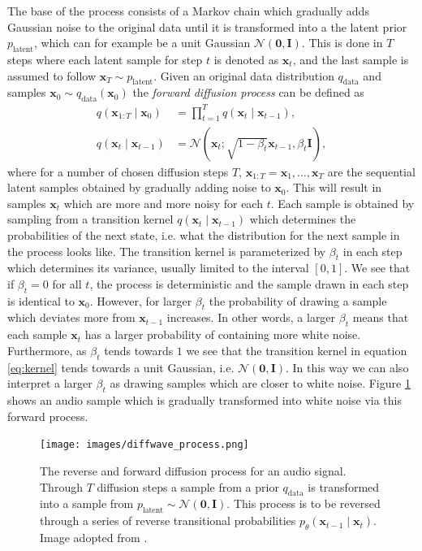\documentclass{report}
\begin{document}
The base of the process consists of a Markov chain which gradually adds Gaussian noise to the original data until it is transformed into a the latent prior $p_{\text{latent}}$, which can for example be a unit Gaussian $\mathcal{N}(\bm{0}, \bm{I})$. This is done in $T$ steps where each latent sample for step $t$ is denoted as $\bm{x}_t$, and the last sample is assumed to follow $\bm{x}_T \sim p_{\text{latent}}$. Given an original data distribution $q_{\text{data}}$ and samples $\bm{x}_0 \sim q_{\text{data}}(\bm{x}_0)$ the \textit{forward diffusion process} can be defined as
\begin{align}
    q(\bm{x}_{1:T} \mid \bm{x}_0) &= \prod_{t=1}^T q(\bm{x}_t \mid \bm{x}_{t-1}), \\
    q(\bm{x}_t \mid \bm{x}_{t-1}) &= \mathcal{N}(\bm{x}_t ; \sqrt{1-\beta_t} \bm{x}_{t-1}, \beta_t \textbf{I}), \label{eq:kernel}
\end{align}
where for a number of chosen diffusion steps $T$, $\bm{x}_{1:T} = \bm{x}_1, \dots, \bm{x}_T$ are the sequential latent samples obtained by gradually adding noise to $\bm{x}_0$. This will result in samples $\bm{x}_t$ which are more and more noisy for each $t$. Each sample is obtained by sampling from a transition kernel $q(\bm{x}_t \mid \bm{x}_{t-1})$ which determines the probabilities of the next state, i.e. what the distribution for the next sample in the process looks like. The transition kernel is parameterized by $\beta_t$ in each step which determines its variance, usually limited to the interval $[0, 1]$. We see that if $\beta_t = 0$ for all $t$, the process is deterministic and the sample drawn in each step is identical to $\bm{x}_0$. However, for larger $\beta_t$ the probability of drawing a sample which deviates more from $\bm{x}_{t-1}$ increases. In other words, a larger $\beta_t$ means that each sample $\bm{x}_t$ has a larger probability of containing more white noise. Furthermore, as $\beta_t$ tends towards $1$ we see that the transition kernel in equation \ref{eq:kernel} tends towards a unit Gaussian, i.e. $\mathcal{N}(\bm{0}, \bm{I})$. In this way we can also interpret a larger $\beta_t$ as drawing samples which are closer to white noise. Figure \ref{fig:diffwave1} shows an audio sample which is gradually transformed into white noise via this forward process.
\begin{figure}[H]
    \centering
    \texttt{[image: images/diffwave\_process.png]}
    \caption{\onehalfspacing The reverse and forward diffusion process for an audio signal. Through $T$ diffusion steps a sample from a prior $q_{\text{data}}$ is transformed into a sample from $p_{\text{latent}} \sim \mathcal{N}(\bm{0}, \bm{I})$. This process is to be reversed through a series of reverse transitional probabilities $p_{\theta}(\bm{x}_{t-1} \mid \bm{x}_{t})$. Image adopted from \cite{kong2020diffwave}.}
    \label{fig:diffwave1}
\end{figure}
\end{document}
